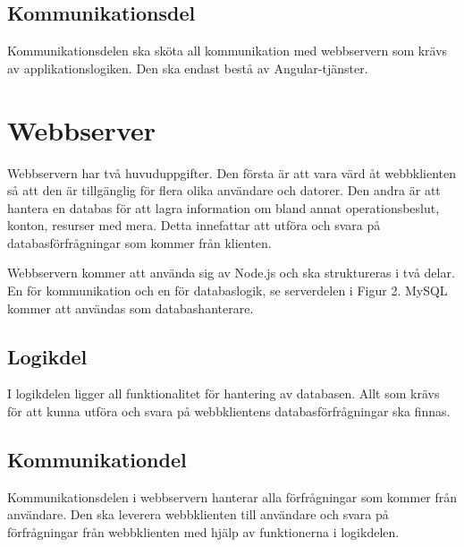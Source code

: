 \documentclass[a4paper,10pt]{article}
\begin{document}
\subsection{Kommunikationsdel}
Kommunikationsdelen ska sköta all kommunikation med webbservern som krävs av applikationslogiken. Den ska endast bestå av Angular-tjänster.

\section{Webbserver}
\label{sec:webbserver}
Webbservern har två huvuduppgifter. Den första är att vara värd åt webbklienten så att den är tillgänglig för flera olika användare och datorer. Den andra är att hantera en databas för att lagra information om bland annat operationsbeslut, konton, resurser med mera. Detta innefattar att utföra och svara på databasförfrågningar som kommer från klienten.

Webbservern kommer att använda sig av Node.js och ska struktureras i två delar. En för kommunikation och en för databaslogik, se serverdelen i Figur 2. MySQL kommer att användas som databashanterare.

\subsection{Logikdel}
I logikdelen ligger all funktionalitet för hantering av databasen. Allt som krävs för att kunna utföra och svara på webbklientens databasförfrågningar ska finnas.

\subsection{Kommunikationdel}
Kommunikationsdelen i webbservern hanterar alla förfrågningar som kommer från användare. Den ska leverera webbklienten till användare och svara på förfrågningar från webbklienten med hjälp av funktionerna i logikdelen.

\clearpage
\printbibliography
\end{document}
